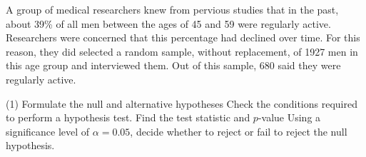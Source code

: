 \documentclass[../mathNotesPreamble]{subfiles}
\begin{document}
  \begin{ex*}
    A group of medical researchers knew from pervious studies that in the past, about 39\% of all men between the ages of 45 and 59 were regularly active. Researchers were concerned that this percentage had declined over time. For this reason, they did selected a random sample, without replacement, of 1927 men in this age group and interviewed them. Out of this sample, 680 said they were regularly active.
  \end{ex*}
  \begin{extasks}[after-item-skip=\stretch{1}](1)
    \task Formulate the null and alternative hypotheses
    \task Check the conditions required to perform a hypothesis test.
    \task Find the test statistic and $p$-value
    \task Using a significance level of $\alpha=0.05$, decide whether to reject or fail to reject the null hypothesis.
  \end{extasks}
  \pagebreak

  \pagebreak
\end{document}
